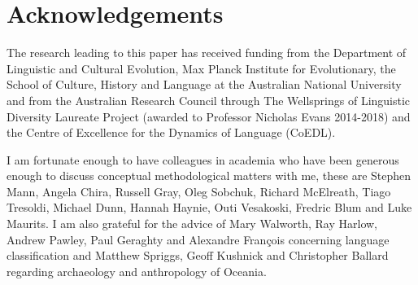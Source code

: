 \documentclass[12pt,letterpaper]{article}
\begin{document}







\newpage



\newpage
\singlespacing





\newpage
\section*{Acknowledgements}

The research leading to this paper has received funding from the Department of Linguistic and Cultural Evolution, Max Planck Institute for Evolutionary, the School of Culture, History and Language at the Australian National University and from the Australian Research Council through The Wellsprings of Linguistic Diversity Laureate Project (awarded to Professor Nicholas Evans 2014-2018) and the Centre of Excellence for the Dynamics of Language (CoEDL).

I am fortunate enough to have colleagues in academia who have been generous enough to discuss conceptual methodological matters with me, these are Stephen Mann, Angela Chira, Russell Gray, Oleg Sobchuk, Richard McElreath, Tiago Tresoldi, Michael Dunn, Hannah Haynie, Outi Vesakoski, Fredric Blum and Luke Maurits. I am also grateful for the advice of Mary Walworth, Ray Harlow, Andrew Pawley, Paul Geraghty and Alexandre François concerning language classification and Matthew Spriggs, Geoff Kushnick and Christopher Ballard regarding archaeology and anthropology of Oceania.
\end{document}
